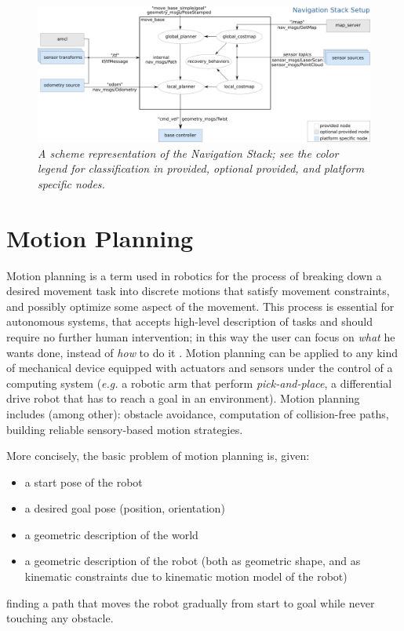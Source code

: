 \begin{figure}
	\centering
	\includegraphics[width=1.1\textwidth]{Images/background_and_tools/navigationStack.png}
	\caption{\textit{A scheme representation of the Navigation Stack; see the color legend for classification in provided, optional provided, and platform specific nodes.}}
	\label{fig:navStack}
\end{figure}


\section{Motion Planning}\label{sec:motionPlanning}

Motion planning is a term used in robotics for the process of breaking down a desired movement task into discrete motions that satisfy movement constraints, and possibly optimize some aspect of the movement. This process is essential for autonomous systems, that accepts high-level description of tasks and should require no further human intervention; in this way the user can focus on \textit{what} he wants done, instead of \textit{how} to do it \parencite{motionPlanning}. Motion planning can be applied to any kind of mechanical device equipped with actuators and sensors under the control of a computing system (\textit{e.g.} a robotic arm that perform \textit{pick-and-place}, a differential drive robot that has to reach a goal in an environment). Motion planning includes (among other): obstacle avoidance, computation of collision-free paths, building reliable sensory-based motion strategies.

More concisely, the basic problem of motion planning is, given:
\begin{itemize}
	\item a start pose of the robot
	\item a desired goal pose (position, orientation)
	\item a geometric description of the world
	\item a geometric description of the robot (both as geometric shape, and as kinematic constraints due to kinematic motion model of the robot)
\end{itemize}
finding a path that moves the robot gradually from start to goal while never touching any obstacle.

